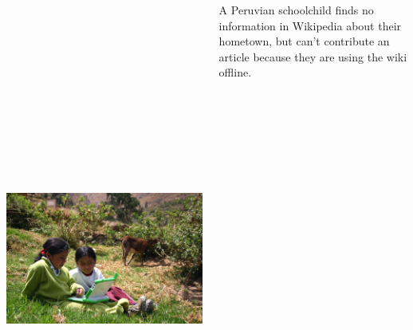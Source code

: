 \documentclass[25pt, a0paper, landscape, cmyk]{tikzposter}
\begin{document}
\begin{columns}
{    \begin{tikzfigure}
      \includegraphics[height=17cm]{Bucolico-full.jpg}
    \end{tikzfigure}

    A Peruvian schoolchild finds no information in Wikipedia about
    their hometown, but can't contribute an article because they are
    using the wiki offline.

  }
\end{columns}
\end{document}

